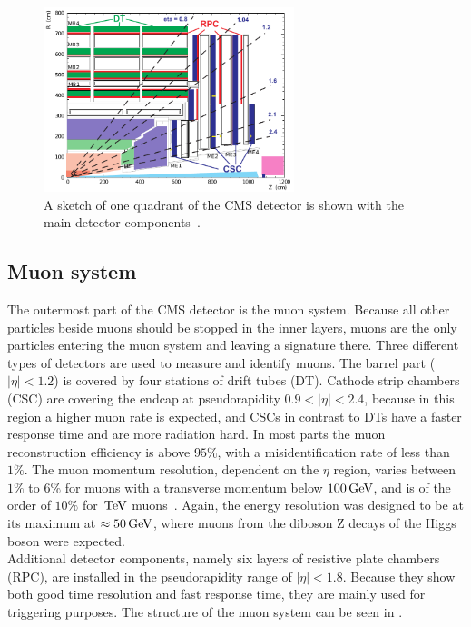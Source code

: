 \begin{figure}[tbp]
 \centering
 \includegraphics[width=0.65\textwidth]{figures/general/muonChamber}
 \caption{A sketch of one quadrant of the CMS detector is shown with the main detector components~\cite{CMSTDR}.}
 \label{fig:etaPlaneCMSTotal}
\end{figure}

\subsection{Muon system}
The outermost part of the CMS detector is the muon system. Because all other particles beside muons should be stopped in the inner layers, muons are the only particles entering the muon system and leaving a signature there. Three different types of detectors are used to measure and identify muons. The barrel part ($|\eta|<1.2$) is covered by four stations of drift tubes (DT). Cathode strip chambers (CSC) are covering the endcap at pseudorapidity $0.9<|\eta|<2.4$, because in this region a higher muon rate is expected, and CSCs in contrast to DTs have a faster response time and are more radiation hard. In most parts the muon reconstruction efficiency is above $95\%$, with a misidentification rate of less than $1\%$. The muon momentum resolution, dependent on the $\eta$ region, varies between $1\%$ to $6\%$ for muons with a transverse momentum below $100\,\text{Ge\hspace{-.08em}V}$, and is of the order of $10\%$ for $\,\text{Te\hspace{-.08em}V}$ muons~\cite{MuonPerformance}. Again, the energy resolution was designed to be at its maximum at $\approx50\,\text{Ge\hspace{-.08em}V}$, where muons from the diboson Z decays of the Higgs boson were expected.\\
Additional detector components, namely six layers of resistive plate chambers (RPC), are installed in the pseudorapidity range of $|\eta|<1.8$. Because they show both good time resolution and fast response time, they are mainly used for triggering purposes. The structure of the muon system can be seen in .

